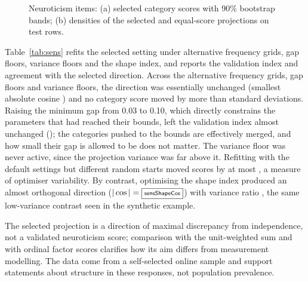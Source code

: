 \begin{figure}[htbp]
\centering
{}
\caption{Neuroticism items: (a) selected category scores with 90\% bootstrap bands; (b) densities of the selected and equal-score projections on test rows.}
\label{fig:bfi}
\end{figure}

Table~\ref{tab:sens} refits the selected setting under alternative frequency grids, gap floors, variance floors and the shape index, and reports the validation index and agreement with the selected direction. Across the alternative frequency grids, gap floors and variance floors, the direction was essentially unchanged (smallest absolute cosine \sensMinCosNum{}) and no category score moved by more than \sensMaxScore{} standard deviations. Raising the minimum gap from 0.03 to 0.10, which directly constrains the parameters that had reached their bounds, left the validation index almost unchanged (\sensMinGapValid{}); the categories pushed to the bounds are effectively merged, and how small their gap is allowed to be does not matter. The variance floor was never active, since the projection variance was far above it. Refitting with the default settings but different random starts moved scores by at most \sensDefaultScore{}, a measure of optimiser variability. By contrast, optimising the shape index produced an almost orthogonal direction ($|\cos|=\fbox{\scriptsize\textsf{sensShapeCos}}$) with variance ratio \sensShapeVar{}, the same low-variance contrast seen in the synthetic example.

\begin{table}[htbp]
\centering\small
{}
\caption{Sensitivity of the selected neuroticism fit to numerical settings (validation rows). The first two columns are comparable across all rows. Rows marked $\dagger$ use a different frequency grid, so their validation index is on a different scale and must not be compared with the other rows. ``Max score change'' is the largest absolute difference in any standardised category score from the selected fit.}
\label{tab:sens}
\end{table}

The selected projection is a direction of maximal discrepancy from independence, not a validated neuroticism score; comparison with the unit-weighted sum and with ordinal factor scores clarifies how its aim differs from measurement modelling. The data come from a self-selected online sample and support statements about structure in these responses, not population prevalence.

